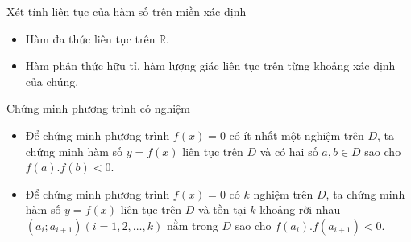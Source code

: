 \begin{dang}{Xét tính liên tục của hàm số trên miền xác định}
	\begin{itemize}
		\item [\iconMT] Hàm đa thức liên tục trên $\mathbb{R}$.
		\item [\iconMT] Hàm phân thức hữu tỉ, hàm lượng giác liên tục trên từng khoảng xác định của chúng.
	\end{itemize}
\end{dang}

\begin{dang}{Chứng minh phương trình có nghiệm}
	\begin{itemize}
		\item [\iconMT] Để chứng minh phương trình $f(x)=0$ có ít nhất một nghiệm trên $D$, ta chứng minh hàm số $y=f(x)$ liên tục trên $ D $ và có hai số $a,b\in D$ sao cho $f(a).f(b)<0$. 
		\item [\iconMT] Để chứng minh phương trình $f(x)=0$ có $ k $ nghiệm trên $ D $, ta chứng minh hàm số $y=f(x)$ liên tục trên $D$ và tồn tại $k$ khoảng rời nhau $(a_i;{a}_{i+1})\left(i=1,2,\ldots ,k\right)$ nằm trong $D$ sao cho $f(a_i).f({a}_{i+1})<0$.
	\end{itemize}
\end{dang}